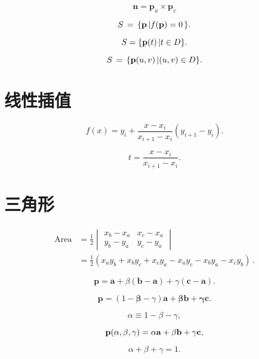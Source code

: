 \documentclass[lang=cn,12pt,marginpar=margintrue]{elegantbook}
\begin{document}
\[
  \mathbf{n}=\mathbf{p}_{u}\times\mathbf{p}_{v}
\]

\[
  S\,=\,\{{\bf p}\,|f({\bf p})=0\,\}.
\]

\[
  S=\{{\bf p}(t)\,|t\in D\}.
\]

\[
  S\,=\,\{{\bf p}(u,v)\,|(u,v)\in D\}.
\]

\section{线性插值}

\begin{equation}
  f(x)=y_{i}+{\frac{x-x_{i}}{x_{i+1}-x_{i}}}(y_{i+1}-y_{i}).
\end{equation}

\[
  t={\frac{x-x_{i}}{x_{i+1}-x_{i}}}.
\]

\section{三角形}

\begin{equation}
  \begin{aligned}
    \mathrm{Area} & = \frac{1}{2}
    \begin{vmatrix}
      x_b-x_a & x_c-x_a \\
      y_b-y_a & y_c-y_a
    \end{vmatrix}                                                                                   \\
                  & = \frac{1}{2}(x_{a}y_{b}+x_{b}y_{c}+x_{c}y_{a}-x_{a}y_{c}-x_{b}y_{a}-x_{c}y_{b})\,.
  \end{aligned}
\end{equation}

\begin{equation}
  \mathbf{p}=\mathbf{a}+\beta(\mathbf{b}-\mathbf{a})+\gamma(\mathbf{c}-\mathbf{a}).
\end{equation}

\[
  \mathbf{p}=(1-{\boldsymbol{\beta}}-\gamma)\mathbf{a}+{\boldsymbol{\beta}}\mathbf{b}+{\boldsymbol{\gamma}}\mathbf{c}.
\]

\[
  \alpha\equiv1-\beta-\gamma,
\]

\begin{equation}
  {\bf p}(\alpha,\beta,\gamma)=\alpha{\bf a}+\beta{\bf b}+\gamma{\bf c},
\end{equation}

\begin{equation}
  \alpha+\beta+\gamma=1.
\end{equation}
\end{document}

